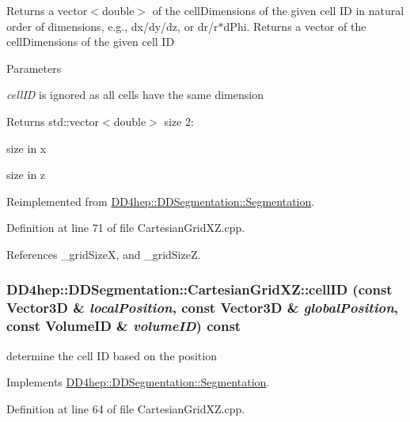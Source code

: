 Returns a vector$<$double$>$ of the cellDimensions of the given cell ID in natural order of dimensions, e.g., dx/dy/dz, or dr/r$\ast$dPhi. Returns a vector of the cellDimensions of the given cell ID 
\begin{DoxyParams}{Parameters}
\item[{\em cellID}]is ignored as all cells have the same dimension \end{DoxyParams}
\begin{DoxyReturn}{Returns}
std::vector$<$double$>$ size 2:
\begin{DoxyEnumerate}
\item size in x
\item size in z 
\end{DoxyEnumerate}
\end{DoxyReturn}


Reimplemented from \hyperlink{class_d_d4hep_1_1_d_d_segmentation_1_1_segmentation_a9710f4942d7f6b52ae5342652e17c88d}{DD4hep::DDSegmentation::Segmentation}.

Definition at line 71 of file CartesianGridXZ.cpp.

References \_\-gridSizeX, and \_\-gridSizeZ.\hypertarget{class_d_d4hep_1_1_d_d_segmentation_1_1_cartesian_grid_x_z_a6db94d0b7df8a5ad6bb3a708281ddd4e}{
\subsubsection[{cellID}]{ DD4hep::DDSegmentation::CartesianGridXZ::cellID (const {\bf Vector3D} \& {\em localPosition}, \/  const {\bf Vector3D} \& {\em globalPosition}, \/  const {\bf VolumeID} \& {\em volumeID}) const}}
\label{class_d_d4hep_1_1_d_d_segmentation_1_1_cartesian_grid_x_z_a6db94d0b7df8a5ad6bb3a708281ddd4e}


determine the cell ID based on the position 

Implements \hyperlink{class_d_d4hep_1_1_d_d_segmentation_1_1_segmentation_ad5a60953d96d409850d8192f64f8ce3c}{DD4hep::DDSegmentation::Segmentation}.

Definition at line 64 of file CartesianGridXZ.cpp.

